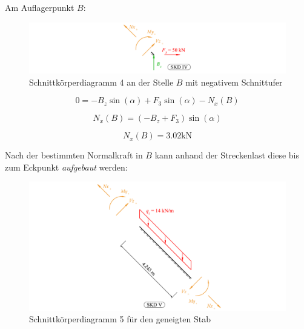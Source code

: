 \documentclass[
  12pt,
  letterpaper,
  DIV=11,
  egregdoesnotlikesansseriftitles]{scrartcl}
\begin{document}
Am Auflagerpunkt \(B\):

\begin{figure}[H]

{\centering \includegraphics{BSI_HS23_Testat_02_files/mediabag/../images/Testat_02_HS23_SKD_4.pdf}

}

\caption{\label{fig-skd_4}Schnittkörperdiagramm 4 an der Stelle \(B\)
mit negativem Schnittufer}

\end{figure}

\begin{equation}0 = - B_{z} \sin{\left(\alpha \right)} + F_{3} \sin{\left(\alpha \right)} - N_{x}{\left(B \right)}\end{equation}

\begin{equation}N_{x}{\left(B \right)} = \left(- B_{z} + F_{3}\right) \sin{\left(\alpha \right)}\end{equation}

\begin{equation}N_{x}{\left(B \right)} = 3.02 \text{k} \text{N}\end{equation}

Nach der bestimmten Normalkraft in \(B\) kann anhand der Streckenlast
diese bis zum Eckpunkt \emph{aufgebaut} werden:

\begin{figure}[H]

{\centering \includegraphics{BSI_HS23_Testat_02_files/mediabag/../images/Testat_02_HS23_SKD_5.pdf}

}

\caption{\label{fig-skd5}Schnittkörperdiagramm 5 für den geneigten Stab}

\end{figure}
\end{document}
